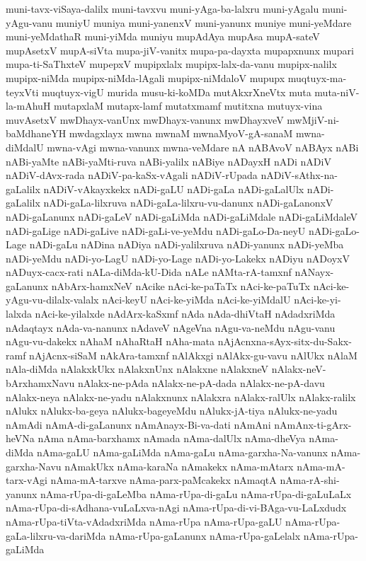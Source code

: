 {muni-tavx-viSaya-dalilx
muni-tavxvu
muni-yAga-ba-lalxru
muni-yAgalu
muni-yAgu-vanu
muniyU
muniya
muni-yanenxV
muni-yanunx
muniye
muni-yeMdare
muni-yeMdathaR
muni-yiMda
muniyu
mupAdAya
mupAsa
mupA-sateV
mupAsetxV
mupA-siVta
mupa-jiV-vanitx
mupa-pa-dayxta
mupapxnunx
mupari
mupa-ti-SaThxteV
mupepxV
mupipxlalx
mupipx-lalx-da-vanu
mupipx-nalilx
mupipx-niMda
mupipx-niMda-lAgali
mupipx-niMdaloV
mupupx
muqtuyx-ma-teyxVti
muqtuyx-vigU
murida
musu-ki-koMDa
mutAkxrXneVtx
muta
muta-niV-la-mAhuH
mutapxlaM
mutapx-lamf
mutatxmamf
mutitxna
mutuyx-vina
muvAsetxV
mwDhayx-vanUnx
mwDhayx-vanunx
mwDhayxveV
mwMjiV-ni-baMdhaneYH
mwdagxlayx
mwna
mwnaM
mwnaMyoV-gA-sanaM
mwna-diMdalU
mwna-vAgi
mwna-vanunx
mwna-veMdare
nA
nABAvoV
nABAyx
nABi
nABi-yaMte
nABi-yaMti-ruva
nABi-yalilx
nABiye
nADayxH
nADi
nADiV
nADiV-dAvx-rada
nADiV-pa-kaSx-vAgali
nADiV-rUpada
nADiV-sAthx-na-gaLalilx
nADiV-vAkayxkekx
nADi-gaLU
nADi-gaLa
nADi-gaLalUlx
nADi-gaLalilx
nADi-gaLa-lilxruva
nADi-gaLa-lilxru-vu-danunx
nADi-gaLanonxV
nADi-gaLanunx
nADi-gaLeV
nADi-gaLiMda
nADi-gaLiMdale
nADi-gaLiMdaleV
nADi-gaLige
nADi-gaLive
nADi-gaLi-ve-yeMdu
nADi-gaLo-Da-neyU
nADi-gaLo-Lage
nADi-gaLu
nADina
nADiya
nADi-yalilxruva
nADi-yanunx
nADi-yeMba
nADi-yeMdu
nADi-yo-LagU
nADi-yo-Lage
nADi-yo-Lakekx
nADiyu
nADoyxV
nADuyx-cacx-rati
nALa-diMda-kU-Dida
nALe
nAMta-rA-tamxnf
nANayx-gaLanunx
nAbArx-hamxNeV
nAcike
nAci-ke-paTaTx
nAci-ke-paTuTx
nAci-ke-yAgu-vu-dilalx-valalx
nAci-keyU
nAci-ke-yiMda
nAci-ke-yiMdalU
nAci-ke-yi-lalxda
nAci-ke-yilalxde
nAdArx-kaSxmf
nAda
nAda-dhiVtaH
nAdadxriMda
nAdaqtayx
nAda-va-nanunx
nAdaveV
nAgeVna
nAgu-va-neMdu
nAgu-vanu
nAgu-vu-dakekx
nAhaM
nAhaRtaH
nAha-mata
nAjAcnxna-sAyx-sitx-du-Sakx-ramf
nAjAcnx-siSaM
nAkAra-tamxnf
nAlAkxgi
nAlAkx-gu-vavu
nAlUkx
nAlaM
nAla-diMda
nAlakxkUkx
nAlakxnUnx
nAlakxne
nAlakxneV
nAlakx-neV-bArxhamxNavu
nAlakx-ne-pAda
nAlakx-ne-pA-dada
nAlakx-ne-pA-davu
nAlakx-neya
nAlakx-ne-yadu
nAlakxnunx
nAlakxra
nAlakx-ralUlx
nAlakx-ralilx
nAlukx
nAlukx-ba-geya
nAlukx-bageyeMdu
nAlukx-jA-tiya
nAlukx-ne-yadu
nAmAdi
nAmA-di-gaLanunx
nAmAnayx-Bi-va-dati
nAmAni
nAmAnx-ti-gArx-heVNa
nAma
nAma-barxhamx
nAmada
nAma-dalUlx
nAma-dheVya
nAma-diMda
nAma-gaLU
nAma-gaLiMda
nAma-gaLu
nAma-garxha-Na-vanunx
nAma-garxha-Navu
nAmakUkx
nAma-karaNa
nAmakekx
nAma-mAtarx
nAma-mA-tarx-vAgi
nAma-mA-tarxve
nAma-parx-paMcakekx
nAmaqtA
nAma-rA-shi-yanunx
nAma-rUpa-di-gaLeMba
nAma-rUpa-di-gaLu
nAma-rUpa-di-gaLuLaLx
nAma-rUpa-di-sAdhana-vuLaLxva-nAgi
nAma-rUpa-di-vi-BAga-vu-LaLxdudx
nAma-rUpa-tiVta-vAdadxriMda
nAma-rUpa
nAma-rUpa-gaLU
nAma-rUpa-gaLa-lilxru-va-dariMda
nAma-rUpa-gaLanunx
nAma-rUpa-gaLelalx
nAma-rUpa-gaLiMda
}
